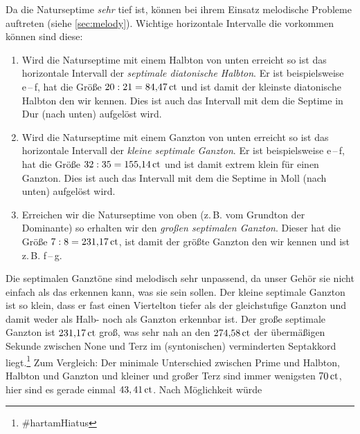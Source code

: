 Da die Naturseptime \emph{sehr} tief ist, können bei ihrem Einsatz melodische Probleme auftreten (siehe \cref{sec:melody}).
Wichtige horizontale Intervalle die vorkommen können sind diese:
\begin{enumerate}
  \item Wird die Naturseptime mit einem Halbton von unten erreicht so ist das horizontale Intervall der \emph{septimale diatonische Halbton}. Er ist beispielsweise \naturalm e\,–\,\septimal f, hat die Größe $20:21 = 84{,}47\,\text{ct}$ und ist damit der kleinste diatonische Halbton den wir kennen. Dies ist auch das Intervall mit dem die Septime in Dur (nach unten) aufgelöst wird.
  \item Wird die Naturseptime mit einem Ganzton von unten erreicht so ist das horizontale Intervall der \emph{kleine septimale Ganzton}. Er ist beispielsweise \flatp e\,–\,\septimal f, hat die Größe $32:35 = 155{,}14\,\text{ct}$ und ist damit extrem klein für einen Ganzton. Dies ist auch das Intervall mit dem die Septime in Moll (nach unten) aufgelöst wird.
  \item Erreichen wir die Naturseptime von oben (z.\,B. vom Grundton der Dominante) so erhalten wir den \emph{großen septimalen Ganzton}. Dieser hat die Größe $7:8 = 231{,}17\,\text{ct}$, ist damit der größte Ganzton den wir kennen und ist z.\,B. \septimal f\,–\,g.
\end{enumerate}

Die septimalen Ganztöne sind melodisch sehr unpassend, da unser Gehör sie nicht einfach als das erkennen kann, was sie sein sollen. Der kleine septimale Ganzton ist so klein, dass er fast einen Viertelton tiefer als der gleichstufige Ganzton und damit weder als Halb- noch als Ganzton erkennbar ist. Der große septimale Ganzton ist $231{,}17\,\text{ct}$ groß, was sehr nah an den $274{,}58\,\text{ct}$ der übermäßigen Sekunde zwischen None und Terz im (syntonischen) verminderten Septakkord liegt.\footnote{\#hartamHiatus} Zum Vergleich: Der minimale Unterschied zwischen Prime und Halbton, Halbton und Ganzton und kleiner und großer Terz sind immer wenigsten $70\,\text{ct}$, hier sind es gerade einmal $43,41\,\text{ct}$. Nach Möglichkeit würde

